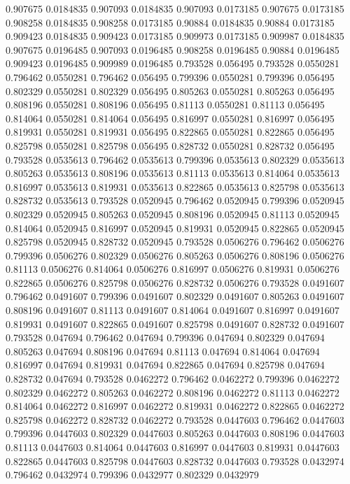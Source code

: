 0.907675 0.0184835
0.907093 0.0184835
0.907093 0.0173185
0.907675 0.0173185
0.908258 0.0184835
0.908258 0.0173185
0.90884 0.0184835
0.90884 0.0173185
0.909423 0.0184835
0.909423 0.0173185
0.909973 0.0173185
0.909987 0.0184835
0.907675 0.0196485
0.907093 0.0196485
0.908258 0.0196485
0.90884 0.0196485
0.909423 0.0196485
0.909989 0.0196485
0.793528 0.056495
0.793528 0.0550281
0.796462 0.0550281
0.796462 0.056495
0.799396 0.0550281
0.799396 0.056495
0.802329 0.0550281
0.802329 0.056495
0.805263 0.0550281
0.805263 0.056495
0.808196 0.0550281
0.808196 0.056495
0.81113 0.0550281
0.81113 0.056495
0.814064 0.0550281
0.814064 0.056495
0.816997 0.0550281
0.816997 0.056495
0.819931 0.0550281
0.819931 0.056495
0.822865 0.0550281
0.822865 0.056495
0.825798 0.0550281
0.825798 0.056495
0.828732 0.0550281
0.828732 0.056495
0.793528 0.0535613
0.796462 0.0535613
0.799396 0.0535613
0.802329 0.0535613
0.805263 0.0535613
0.808196 0.0535613
0.81113 0.0535613
0.814064 0.0535613
0.816997 0.0535613
0.819931 0.0535613
0.822865 0.0535613
0.825798 0.0535613
0.828732 0.0535613
0.793528 0.0520945
0.796462 0.0520945
0.799396 0.0520945
0.802329 0.0520945
0.805263 0.0520945
0.808196 0.0520945
0.81113 0.0520945
0.814064 0.0520945
0.816997 0.0520945
0.819931 0.0520945
0.822865 0.0520945
0.825798 0.0520945
0.828732 0.0520945
0.793528 0.0506276
0.796462 0.0506276
0.799396 0.0506276
0.802329 0.0506276
0.805263 0.0506276
0.808196 0.0506276
0.81113 0.0506276
0.814064 0.0506276
0.816997 0.0506276
0.819931 0.0506276
0.822865 0.0506276
0.825798 0.0506276
0.828732 0.0506276
0.793528 0.0491607
0.796462 0.0491607
0.799396 0.0491607
0.802329 0.0491607
0.805263 0.0491607
0.808196 0.0491607
0.81113 0.0491607
0.814064 0.0491607
0.816997 0.0491607
0.819931 0.0491607
0.822865 0.0491607
0.825798 0.0491607
0.828732 0.0491607
0.793528 0.047694
0.796462 0.047694
0.799396 0.047694
0.802329 0.047694
0.805263 0.047694
0.808196 0.047694
0.81113 0.047694
0.814064 0.047694
0.816997 0.047694
0.819931 0.047694
0.822865 0.047694
0.825798 0.047694
0.828732 0.047694
0.793528 0.0462272
0.796462 0.0462272
0.799396 0.0462272
0.802329 0.0462272
0.805263 0.0462272
0.808196 0.0462272
0.81113 0.0462272
0.814064 0.0462272
0.816997 0.0462272
0.819931 0.0462272
0.822865 0.0462272
0.825798 0.0462272
0.828732 0.0462272
0.793528 0.0447603
0.796462 0.0447603
0.799396 0.0447603
0.802329 0.0447603
0.805263 0.0447603
0.808196 0.0447603
0.81113 0.0447603
0.814064 0.0447603
0.816997 0.0447603
0.819931 0.0447603
0.822865 0.0447603
0.825798 0.0447603
0.828732 0.0447603
0.793528 0.0432974
0.796462 0.0432974
0.799396 0.0432977
0.802329 0.0432979
